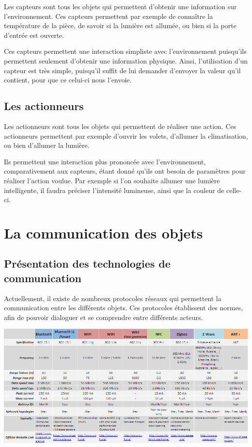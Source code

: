 Les capteurs sont tous les objets qui permettent d'obtenir une information sur l'environnement. Ces capteurs 
permettent par exemple de connaître la température de la pièce, de savoir si la lumière est allumée, ou 
bien si la porte d'entrée est ouverte.

Ces capteurs permettent une interaction simpliste avec l'environnement puisqu'ils permettent seulement 
d'obtenir une information physique. Ainsi, l'utilisation d'un capteur est très simple, puisqu'il suffit de 
lui demander d'envoyer la valeur qu'il contient, pour que ce celui-ci nous l'envoie.
	\subsection{Les actionneurs}
	
Les actionneurs sont tous les objets qui permettent de réaliser une action. Ces actionneurs permettent par 
exemple d'ouvrir les volets, d'allumer la climatisation, ou bien d'allumer la lumière.

Ils permettent une interaction plus prononcée avec l'environnement, comparativement aux capteurs, étant donné 
qu'ils ont besoin de paramètres pour réaliser l'action voulue. Par exemple si l'on souhaite allumer une 
lumière intelligente, il faudra préciser l'intensité lumineuse, ainsi que la couleur de celle-ci.

\section{La communication des objets}
	\subsection{Présentation des technologies de communication}
Actuellement, il existe de nombreux protocoles réseaux qui permettent la communication entre les différents 
objets. Ces protocoles établissent des normes, afin de pouvoir dialoguer et se comprendre entre différents 
acteurs.

\includegraphics{img/tableau-total.png} 

